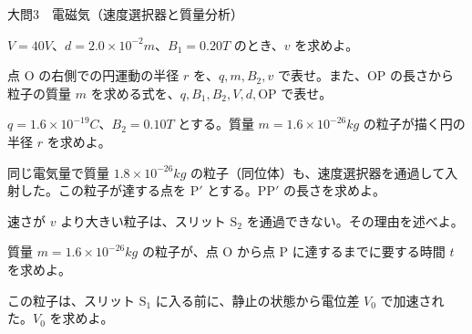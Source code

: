\documentclass[paper=b5, fontsize=8pt, fleqn, twoside]{jlreq}
\begin{document}
\begin{ascolorbox4A}[75点・30分]{大問3　電磁気（速度選択器と質量分析）}
\begin{qlist}[series=uc]
\item $V=40\unit{V}$、$d=2.0\times10^{-2}\unit{m}$、$B_1=0.20\unit{T}$ のとき、$v$ を求めよ。
\item 点 $\mathrm{O}$ の右側での円運動の半径 $r$ を、$q,m,B_2,v$ で表せ。また、$\mathrm{OP}$ の長さから粒子の質量 $m$ を求める式を、$q,B_1,B_2,V,d,\mathrm{OP}$ で表せ。
\item $q=1.6\times10^{-19}\unit{C}$、$B_2=0.10\unit{T}$ とする。質量 $m=1.6\times10^{-26}\unit{kg}$ の粒子が描く円の半径 $r$ を求めよ。
\item 同じ電気量で質量 $1.8\times10^{-26}\unit{kg}$ の粒子（同位体）も、速度選択器を通過して入射した。この粒子が達する点を $\mathrm{P}'$ とする。$\mathrm{PP}'$ の長さを求めよ。
\item 速さが $v$ より大きい粒子は、スリット $\mathrm{S}_2$ を通過できない。その理由を述べよ。
\item 質量 $m=1.6\times10^{-26}\unit{kg}$ の粒子が、点 $\mathrm{O}$ から点 $\mathrm{P}$ に達するまでに要する時間 $t$ を求めよ。
\item この粒子は、スリット $\mathrm{S}_1$ に入る前に、静止の状態から電位差 $V_0$ で加速された。$V_0$ を求めよ。
\end{qlist}
\end{ascolorbox4A}
\end{document}
